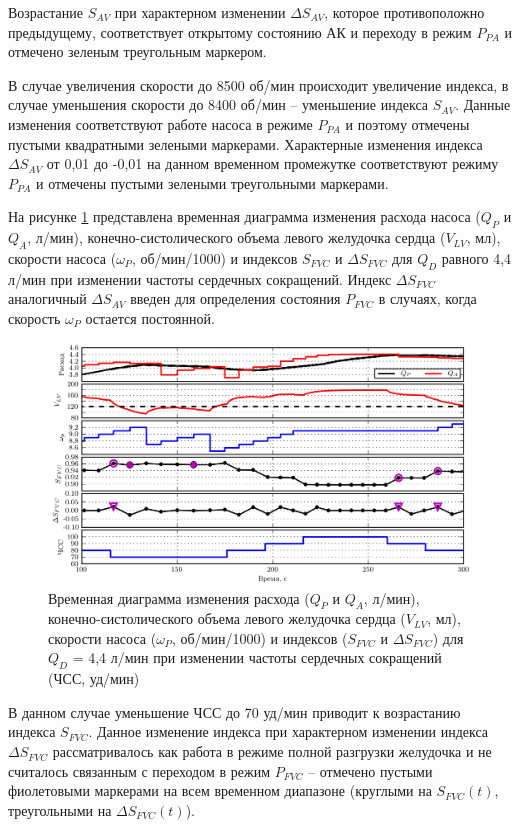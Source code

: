 Возрастание $S_{AV}$ при характерном изменении $\Delta S_{AV}$, которое противоположно предыдущему, соответствует открытому состоянию АК и переходу в режим $P_{PA}$ и отмечено зеленым треугольным маркером. 

В случае увеличения скорости до 8500 об/мин происходит увеличение индекса, в случае уменьшения скорости до 8400 об/мин -- уменьшение индекса $S_{AV}$. Данные изменения соответствуют работе насоса в режиме $P_{PA}$ и поэтому отмечены пустыми квадратными зелеными маркерами. Характерные изменения индекса $\Delta S_{AV}$ от 0,01 до -0,01 на данном временном промежутке соответствуют режиму $P_{PA}$ и отмечены пустыми зелеными треугольными маркерами.

На рисунке \ref{img:waveform_pvc_fvc} представлена временная диаграмма изменения расхода насоса ($Q_P$ и $Q_A$, л/мин), конечно-систолического объема левого желудочка сердца ($V_{LV}$, мл), скорости насоса ($\omega_P$, об/мин/1000) и индексов $S_{FVC}$ и $\Delta S_{FVC}$ для $Q_D$ равного 4,4 л/мин при изменении частоты сердечных сокращений. Индекс $\Delta S_{FVC}$ аналогичный $\Delta S_{AV}$ введен для определения состояния $P_{FVC}$ в случаях, когда скорость $\omega_P$ остается постоянной. 

\begin{figure}[ht] 
  \center
  \includegraphics [scale=1.0] {../images/c3_waveform_pvc_fvc_control}
  \caption{Временная диаграмма изменения расхода ($Q_P$ и $Q_A$, л/мин), конечно-систолического объема левого желудочка сердца ($V_{LV}$, мл), скорости насоса ($\omega_P$, об/мин/1000) и индексов ($S_{FVC}$ и $\Delta S_{FVC}$) для $Q_D$ = 4,4 л/мин при изменении частоты сердечных сокращений (ЧСС, уд/мин)} 
  \label{img:waveform_pvc_fvc}  
\end{figure}

В данном случае уменьшение ЧСС до 70 уд/мин приводит к возрастанию индекса $S_{FVC}$. Данное изменение индекса при характерном изменении индекса $\Delta S_{FVC}$ рассматривалось как работа в режиме полной разгрузки желудочка и не считалось связанным с переходом в режим $P_{FVC}$ -- отмечено пустыми фиолетовыми маркерами на всем временном диапазоне (круглыми на $S_{FVC}(t)$, треугольными на $\Delta S_{FVC}(t)$). 

